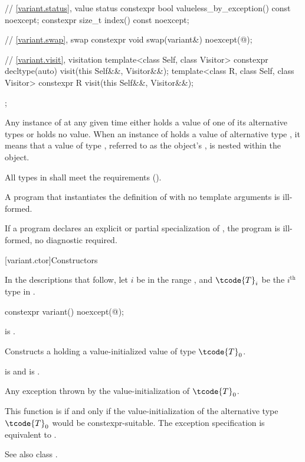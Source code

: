 \begin{codeblock}
{{    // \ref{variant.status}, value status
    constexpr bool valueless_by_exception() const noexcept;
    constexpr size_t index() const noexcept;

    // \ref{variant.swap}, swap
    constexpr void swap(variant&) noexcept(@\seebelow@);

    // \ref{variant.visit}, visitation
    template<class Self, class Visitor>
      constexpr decltype(auto) visit(this Self&&, Visitor&&);
    template<class R, class Self, class Visitor>
      constexpr R visit(this Self&&, Visitor&&);
  };
}
\end{codeblock}

\pnum
Any instance of  at any given time either holds a value
of one of its alternative types or holds no value.
When an instance of  holds a value of alternative type ,
it means that a value of type , referred to as the 
object's ,
is nested within the
 object.

\pnum
All types in  shall meet
the  requirements ().

\pnum
A program that instantiates the definition of  with
no template arguments is ill-formed.

\pnum
If a program declares an explicit or partial specialization of ,
the program is ill-formed, no diagnostic required.

[variant.ctor]{Constructors}

\pnum
In the descriptions that follow, let $i$ be in the range ,
and $\tcode{T}_i$ be the $i^\text{th}$ type in .

%
\begin{itemdecl}
constexpr variant() noexcept(@\seebelow@);
\end{itemdecl}

\begin{itemdescr}
\pnum
\constraints
{} is .

\pnum
\effects
Constructs a  holding a value-initialized value of type $\tcode{T}_0$.

\pnum
\ensures
{} is  and  is .

\pnum
\throws
Any exception thrown by the value-initialization of $\tcode{T}_0$.

\pnum
\remarks
This function is  if and only if the
value-initialization of the alternative type $\tcode{T}_0$
would be constexpr-suitable.
The exception specification is equivalent to
.
\begin{note}
See also class .
\end{note}
\end{itemdescr}

